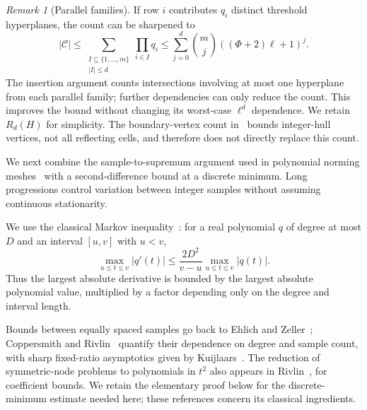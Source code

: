 \documentclass[final,5p,times,twocolumn]{elsarticle}
\theoremstyle{definition}\newtheorem{definition}{Definition}[section]
\theoremstyle{remark}\newtheorem{remark}[theorem]{Remark}
\begin{document}
\begin{remark}[Parallel families]
If row $i$ contributes $q_i$ distinct threshold hyperplanes, the count can be sharpened to
\[
 |\mathcal C|\le
 \sum_{\substack{I\subseteq\{1,\ldots,m\}\\|I|\le d}}
 \prod_{i\in I}q_i
 \le\sum_{j=0}^d\binom mj((\Phi+2)\ell+1)^j.
\]
The insertion argument counts intersections involving at most one hyperplane from each parallel family; further dependencies can only reduce the count. This improves the bound without changing its worst-case $\ell^d$ dependence. We retain $R_d(H)$ for simplicity. The boundary-vertex count in~\cite[pp.~30--31]{CHKM} bounds integer-hull vertices, not all reflecting cells, and therefore does not directly replace this count.
\end{remark}

We next combine the sample-to-supremum argument used in polynomial norming meshes~\cite[proof of Proposition~2]{PV} with a second-difference bound at a discrete minimum. Long progressions control variation between integer samples without assuming continuous stationarity.

We use the classical Markov inequality~\cite[Theorem~5.1.8]{BorweinErdelyi}: for a real polynomial $q$ of degree at most $D$ and an interval $[u,v]$ with $u<v$,
\[
 \max_{u\le t\le v}|q'(t)|
 \le\frac{2D^2}{v-u}\max_{u\le t\le v}|q(t)|.
\]
Thus the largest absolute derivative is bounded by the largest absolute polynomial value, multiplied by a factor depending only on the degree and interval length.

Bounds between equally spaced samples go back to Ehlich and Zeller~\cite{EhlichZeller}; Coppersmith and Rivlin~\cite{CoppersmithRivlin} quantify their dependence on degree and sample count, with sharp fixed-ratio asymptotics given by Kuijlaars~\cite{Kuijlaars}. The reduction of symmetric-node problems to polynomials in $t^2$ also appears in Rivlin~\cite[p.~539]{RivlinSurvey}, for coefficient bounds. We retain the elementary proof below for the discrete-minimum estimate needed here; these references concern its classical ingredients.
\end{document}
